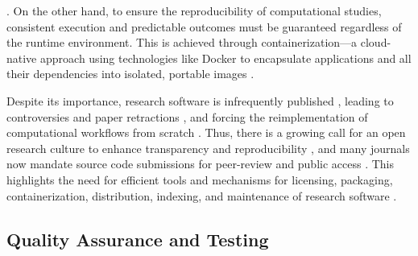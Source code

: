 \documentclass{article}
\begin{document}
\cite{NamingThePainInDevSciSoft, CompSciError}. On the other hand, to ensure the reproducibility of computational studies, consistent execution and predictable outcomes must be guaranteed regardless of the runtime environment. This is achieved through containerization—a cloud-native approach using technologies like Docker to encapsulate applications and all their dependencies into isolated, portable images \cite{AdoptingSoftEngConceptsInSciResearch, 10RuleForSoftwareInCompBio, ELIXIRSoftwareManagementPlan, Docker}.

Despite its importance, research software is infrequently published \cite{AnalyzingGitHubRepoOfPapers, BridgingTheChasm, PublishYourCode, CompSciError}, leading to controversies and paper retractions \cite{InfluentialPandemicSimulation, RetractionCOVID}, and forcing the reimplementation of computational workflows from scratch \cite{ProblemsOfEndUserDevs, BetterSoftwareBetterResearch, SurveySEPracticesInScience2, SoftEngForCompSci}. Thus, there is a growing call for an open research culture to enhance transparency and reproducibility \cite{PromotingOpenResearch, ReprodResearchInCompSci, EnhancingReproducibility, TroublingTrendsInSciSoftware}, and many journals now mandate source code submissions for peer-review and public access \cite{RealSoftwareCrisis, DoesYourCodeStandUp, TowardReproducibleCompResearch, MakingDataMaximallyAvailable, JournalOfBioStatPolicy}. This highlights the need for efficient tools and mechanisms for licensing, packaging, containerization, distribution, indexing, and maintenance of research software \cite{CaseForOpenCompProg, SurveySEPracticesInScience, ReprodResearchInCompSci, BarelySufficientPracticesInSciComp, BetterSoftwareBetterResearch, PublishYourCode}.

\subsection{Quality Assurance and Testing}
\end{document}
